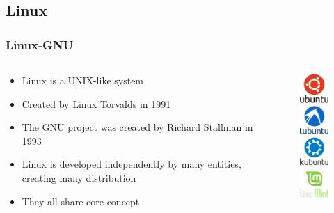\documentclass{beamer}
\begin{document}
\subsection{Linux}
\begin{frame}
\frametitle{Linux-GNU}
\begin{columns}
\begin{column}{7cm}
\begin{itemize}
\item Linux is a UNIX-like system
\item Created by Linux Torvalds in 1991
\item The GNU project was created by Richard Stallman in 1993
\item Linux is developed independently by many entities, creating many distribution
\item They all share core concept
\end{itemize}
\end{column}
\begin{column}{4cm}
\begin{figure}
\includegraphics[scale=0.2]{ubuntu.png}\\%
\includegraphics[scale=0.2]{lubuntu.png}\\%
\includegraphics[scale=0.2]{kubuntu.png}\\
\includegraphics[scale=0.2]{mint.png}\\%

\end{figure}
\end{column}
\end{columns}
\end{frame}
\end{document}

